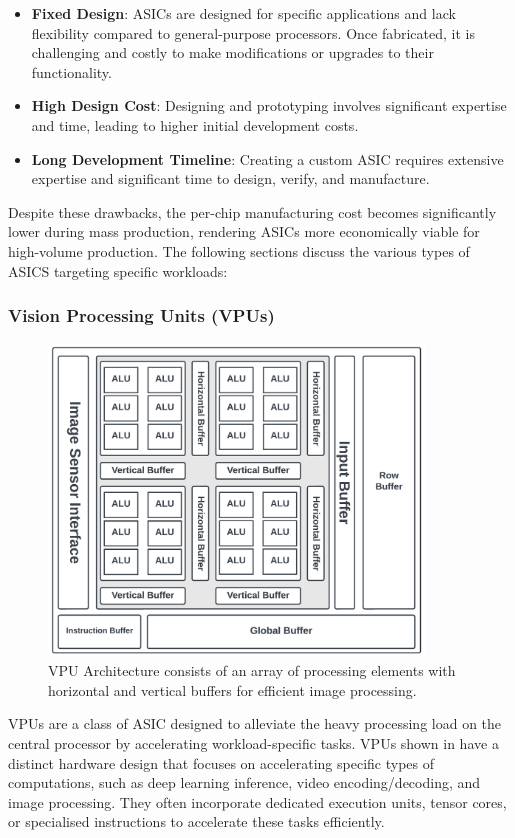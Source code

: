 \begin{itemize}
    \item \textbf{Fixed Design}: ASICs are designed for specific applications and lack flexibility compared to general-purpose processors. Once fabricated, it is challenging and costly to make modifications or upgrades to their functionality.
    \item \textbf{High Design Cost}: Designing and prototyping involves significant expertise and time, leading to higher initial development costs.
    \item \textbf{Long Development Timeline}: Creating a custom ASIC requires extensive expertise and significant time to design, verify, and manufacture. 
\end{itemize}

Despite these drawbacks, the per-chip manufacturing cost becomes significantly lower during mass production, rendering ASICs more economically viable for high-volume production. The following sections discuss the various types of ASICS targeting specific workloads:
 
\subsubsection{Vision Processing Units (VPUs)}
\begin{figure}[H]
\centering
\includegraphics[width=10cm]{Images/VPU.png}
\caption[Vision Processing Unit Architecture]{VPU Architecture consists of an array of processing elements with horizontal and vertical buffers for efficient image processing.}
\label{fig:VPU}
\end{figure} 


VPUs are a class of ASIC designed to alleviate the heavy processing load on the central processor by accelerating workload-specific tasks. VPUs shown in  have a distinct hardware design that focuses on accelerating specific types of computations, such as deep learning inference, video encoding/decoding, and image processing. They often incorporate dedicated execution units, tensor cores, or specialised instructions to accelerate these tasks efficiently.

